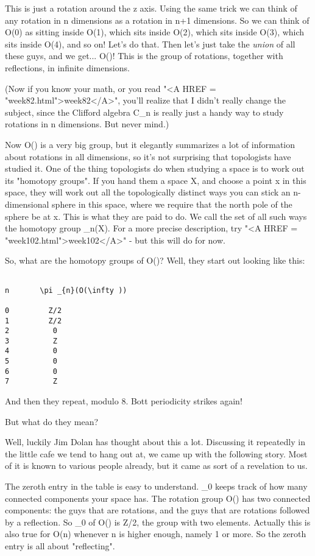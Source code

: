 This is just a rotation around the z axis.  Using the same trick
we can think of any rotation in n dimensions as a rotation in n+1
dimensions.  So we can think of O(0) as sitting inside O(1), which
sits inside O(2), which sits inside O(3), which sits inside O(4),
and so on!  Let's do that.  Then let's just take the \emph{union} of
all these guys, and we get... O(\infty )!  This is the group of
rotations, together with reflections, in infinite dimensions.

(Now if you know your math, or you read "<A HREF = "week82.html">week82</A>", you'll realize that I
didn't really change the subject, since the Clifford algebra C_{n} is
really just a handy way to study rotations in n dimensions.  But never
mind.)  

Now O(\infty ) is a very big group, but it elegantly summarizes a lot
of information about rotations in all dimensions, so it's not
surprising that topologists have studied it.  One of the thing
topologists do when studying a space is to work out its "homotopy
groups".  If you hand them a space X, and choose a point x in this
space, they will work out all the topologically distinct ways you can
stick an n-dimensional sphere in this space, where we require that the
north pole of the sphere be at x.  This is what they are paid to do.
We call the set of all such ways the homotopy group \pi _{n}(X).  For a
more precise description, try "<A HREF = "week102.html">week102</A>" - but this will do for now.

So, what are the homotopy groups of O(\infty )?  Well, they start out
looking like this:


\begin{verbatim}

n       \pi _{n}(O(\infty ))

0         Z/2
1         Z/2
2          0
3          Z
4          0
5          0
6          0
7          Z
\end{verbatim}
    
And then they repeat, modulo 8.  Bott periodicity strikes again!

But what do they mean?

Well, luckily Jim Dolan has thought about this a lot.  Discussing
it repeatedly in the little cafe we tend to hang out at, we came up
with the following story.  Most of it is known to various people
already, but it came as sort of a revelation to us.

The zeroth entry in the table is easy to understand.  \pi _{0} keeps track
of how many connected components your space has.  The rotation group
O(\infty ) has two connected components: the guys that are rotations,
and the guys that are rotations followed by a reflection.  So \pi _{0} of
O(\infty ) is Z/2, the group with two elements.  Actually this is
also true for O(n) whenever n is higher enough, namely 1 or more.
So the zeroth entry is all about "reflecting".  

